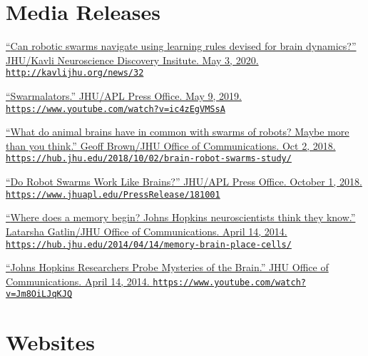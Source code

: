 \documentclass[10pt]{article}
\newcommand{\itemtitle}[1]{{\color{hopkinsblue}\ul{#1}}}
\newcommand{\aurl}[1]{{\color{dimgray}\texttt{#1}}}
\begin{document}
\section*{Media Releases}

\begin{description}
  \item \href{http://kavlijhu.org/news/32} {``\itemtitle{Can
        robotic swarms navigate using learning rules devised for brain
      dynamics?}'' JHU/Kavli Neuroscience Discovery Insitute. May 3, 2020.
    \aurl{http://kavlijhu.org/news/32}}
  \item \href{https://www.youtube.com/watch?v=ic4zEgVMSsA}
    {``\itemtitle{Swarmalators}.'' JHU/APL Press Office. May 9, 2019.
    \aurl{https://www.youtube.com/watch?v=ic4zEgVMSsA}}
  \item \href{https://hub.jhu.edu/2018/10/02/brain-robot-swarms-study/}
    {``\itemtitle{What do animal brains have in common with swarms of robots?
      Maybe more than you think}.'' Geoff Brown/JHU Office of Communications. Oct 2,
    2018. \aurl{https://hub.jhu.edu/2018/10/02/brain-robot-swarms-study/}}
  \item \href{https://www.jhuapl.edu/PressRelease/181001}
    {``\itemtitle{Do Robot Swarms Work Like Brains?}'' JHU/APL Press Office. October 1, 2018.
    \aurl{https://www.jhuapl.edu/PressRelease/181001}}
  \item \href{https://hub.jhu.edu/2014/04/14/memory-brain-place-cells/}
    {``\itemtitle{Where does a memory begin? Johns Hopkins neuroscientists think they
      know}.'' Latarsha Gatlin/JHU Office of Communications. April 14, 2014.
    \aurl{https://hub.jhu.edu/2014/04/14/memory-brain-place-cells/}}
  \item \href{https://www.youtube.com/watch?v=Jm8OiLJqKJQ}
    {``\itemtitle{Johns Hopkins Researchers Probe Mysteries of
      the Brain}.'' JHU Office of Communications. April 14, 2014.
    \aurl{https://www.youtube.com/watch?v=Jm8OiLJqKJQ}}
\end{description}

\section*{Websites}
\end{document}
